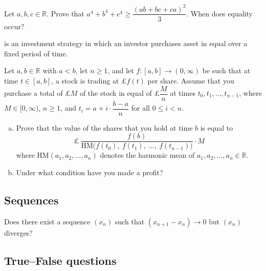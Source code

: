 \begin{chapex}
Let $a,b,c \in \mathbb{R}$. Prove that $a^4 + b^4 + c^4 \ge \dfrac{(ab+bc+ca)^2}{3}$. When does equality occur?
\end{chapex}

\begin{chapex}
\newcommand{\currency}{£}
\gbus{}{\renewcommand{\currency}{\$}}
 is an investment strategy in which an investor purchases asset in equal  over a fixed period of time.

Let $a,b \in \mathbb{R}$ with $a<b$, let $n \ge 1$, and let $f : [a,b] \to (0,\infty)$ be such that at time $t \in [a,b]$, a stock is trading at \currency{}$f(t)$ per share. Assume that you purchase a total of \currency{}$M$ of the stock in equal  of \currency{}$\dfrac{M}{n}$ at times $t_0, t_1, \dots, t_{n-1}$, where $M \in [0,\infty)$, $n \ge 1$, and $t_i = a + i \cdot \dfrac{b-a}{n}$ for all $0 \le i < n$.

\begin{enumerate}[(a)]
\item Prove that the value of the shares that you hold at time $b$ is equal to
\[ \text{\currency{}}~\dfrac{f(b)}{\mathrm{HM} \big ( f(t_0),~ f(t_1),~ \dots,~ f(t_{n-1}) \big)} \cdot M \]
where $\mathrm{HM}(a_1,a_2,\dots,a_n)$ denotes the harmonic mean of $a_1,a_2,\dots,a_n \in \mathbb{R}$.

\item Under what condition have you made a profit?
\end{enumerate}
\end{chapex}

\subsection*{Sequences}

\begin{chapex}
Does there exist a sequence $(x_n)$ such that $(x_{n+1} - x_n) \to 0$ but $(x_n)$ diverges?
\end{chapex}

\subsection*{True--False questions}

